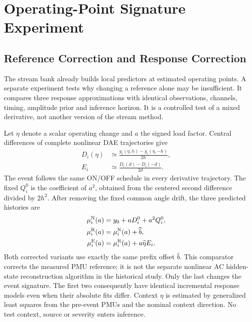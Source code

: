 \section{Operating-Point Signature Experiment}
\label{sec:ei-x02}

\subsection{Reference Correction and Response Correction}
The stream bank already builds local predictors at estimated operating
points. A separate experiment tests why changing a reference alone may be
insufficient. It compares three response approximations with identical
observations, channels, timing, amplitude prior and inference horizon.
It is a controlled test of a mixed derivative, not another version of the stream method.

Let $\eta$ denote a scalar operating change and $a$ the signed load factor.
Central differences of complete nonlinear DAE trajectories give
\begin{align}
 D_i(\eta)&\simeq\frac{y_i(\eta,h)-y_i(\eta,-h)}{2h},\nonumber\\
 E_i&\simeq\frac{D_i(d)-D_i(-d)}{2d}.
 \label{eq:ei-mixed-response}
\end{align}
The event follows the same ON/OFF schedule in every derivative trajectory.
The fixed $Q_i^0$ is the coefficient of $a^2$, obtained from the centered
second difference divided by $2h^2$. After removing the fixed common
angle drift, the three predicted histories are
\begin{align}
 \mu_i^{\rm N}(a)&=y_0+aD_i^0+a^2Q_i^0,\nonumber\\
 \mu_i^{\rm R}(a)&=\mu_i^{\rm N}(a)+\widehat b,\nonumber\\
 \mu_i^{\rm E}(a)&=\mu_i^{\rm R}(a)+a\widehat\eta E_i.
 \label{eq:ei-three-predictions}
\end{align}
Both corrected variants use exactly the same prefix offset $\widehat b$.
This comparator corrects the measured PMU reference; it is not the separate
nonlinear AC hidden-state reconstruction algorithm in the historical study.
Only the last changes the event signature. The first two consequently
have identical incremental response models even when their absolute fits
differ. Context $\widehat\eta$ is estimated by generalized least squares
from the pre-event PMUs and the nominal context direction. No test context,
source or severity enters inference.



